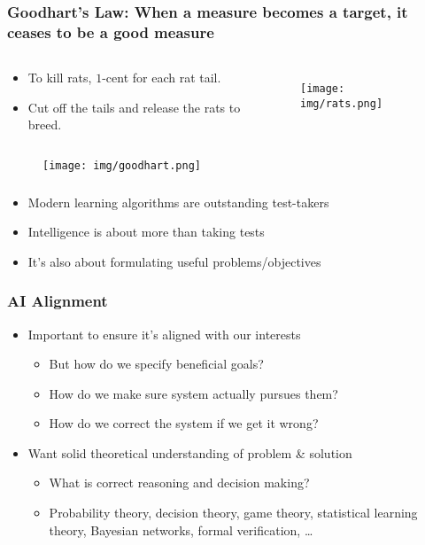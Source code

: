 \documentclass[UTF8,11pt,colorlinks,compress,openany]{beamer}%
\begin{document}
\begin{frame}\frametitle{Goodhart's Law: When a measure becomes a target, it ceases to be a good measure}
\vspace*{-2ex}
\begin{columns}
\begin{example}
\begin{itemize}
	\item To kill rats, $1$-cent for each rat tail.
	\item Cut off the tails and release the rats to breed.
\end{itemize}
\end{example}
\begin{figure}
\texttt{[image: img/rats.png]}
\end{figure}
\end{columns}
\begin{figure}[H]
 \texttt{[image: img/goodhart.png]}
\end{figure}	
\end{frame}

\begin{frame}\frametitle{}
\begin{itemize}
	\item Modern learning algorithms are outstanding test-takers
	\item Intelligence is about more than taking tests
	\item It's also about formulating useful problems/objectives
\end{itemize}
\end{frame}

\begin{frame}\frametitle{AI Alignment}
\begin{itemize}
	\item Important to ensure it's aligned with our interests
		\begin{itemize}
			\item But how do we specify beneficial goals?
			\item How do we make sure system actually pursues them?
			\item How do we correct the system if we get it wrong?
		\end{itemize}
	\item Want solid theoretical understanding of problem \& solution
		\begin{itemize}
			\item What is correct reasoning and decision making?
			\item Probability theory, decision theory, game theory, statistical learning theory, Bayesian networks, formal verification, \dots
		\end{itemize}
\end{itemize}
\end{frame}
\end{document}
